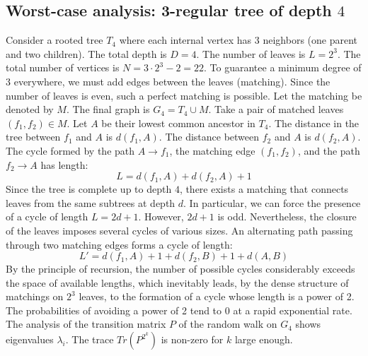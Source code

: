 \documentclass[11pt,a4paper]{article}
\begin{document}
\subsection{Worst-case analysis: 3-regular tree of depth $4$}
Consider a rooted tree $T_{4}$ where each internal vertex has 3 neighbors (one parent and two children).
The total depth is $D = 4$.
The number of leaves is $L = 2^{3}$.
The total number of vertices is $N = 3 \cdot 2^{3} - 2 = 22$.
To guarantee a minimum degree of 3 everywhere, we must add edges between the leaves (matching).
Since the number of leaves is even, such a perfect matching is possible.
Let the matching be denoted by $M$. The final graph is $G_{4} = T_{4} \cup M$.
Take a pair of matched leaves $(f_1, f_2) \in M$.
Let $A$ be their lowest common ancestor in $T_{4}$.
The distance in the tree between $f_1$ and $A$ is $d(f_1, A)$.
The distance between $f_2$ and $A$ is $d(f_2, A)$.
The cycle formed by the path $A \to f_1$, the matching edge $(f_1, f_2)$, and the path $f_2 \to A$ has length:
$$ L = d(f_1, A) + d(f_2, A) + 1 $$
Since the tree is complete up to depth $4$, there exists a matching that connects leaves from the same subtrees at depth $d$.
In particular, we can force the presence of a cycle of length $L = 2d + 1$. However, $2d+1$ is odd.
Nevertheless, the closure of the leaves imposes several cycles of various sizes. An alternating path passing through two matching edges forms a cycle of length:
$$ L' = d(f_1, A) + 1 + d(f_2, B) + 1 + d(A, B) $$
By the principle of recursion, the number of possible cycles considerably exceeds the space of available lengths, which inevitably leads, by the dense structure of matchings on $2^{3}$ leaves, to the formation of a cycle whose length is a power of 2. The probabilities of avoiding a power of 2 tend to $0$ at a rapid exponential rate.
The analysis of the transition matrix $P$ of the random walk on $G_{4}$ shows eigenvalues $\lambda_i$. The trace $Tr(P^{2^k})$ is non-zero for $k$ large enough.
\end{document}
